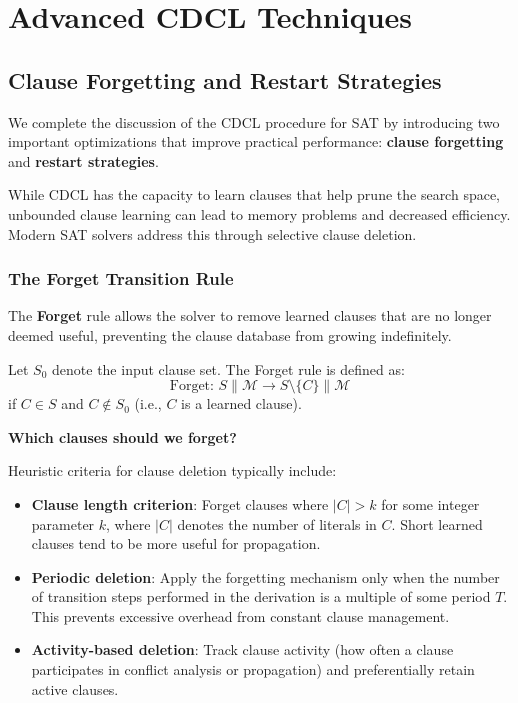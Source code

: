 \documentclass[11pt,a4paper]{article}
\theoremstyle{definition}
\theoremstyle{plain}
\theoremstyle{remark}
\begin{document}
\newpage 

\section{Advanced CDCL Techniques}

\subsection{Clause Forgetting and Restart Strategies}

We complete the discussion of the CDCL procedure for SAT by introducing two important optimizations that improve practical performance: \textbf{clause forgetting} and \textbf{restart strategies}.

While CDCL has the capacity to learn clauses that help prune the search space, unbounded clause learning can lead to memory problems and decreased efficiency. Modern SAT solvers address this through selective clause deletion.

\subsubsection{The Forget Transition Rule}

The \textbf{Forget} rule allows the solver to remove learned clauses that are no longer deemed useful, preventing the clause database from growing indefinitely.

\begin{tcolorbox}[colback=red!5!white,colframe=red!75!black,title=\textbf{Forget Transition Rule}]
Let $S_0$ denote the input clause set. The Forget rule is defined as:
\[
\text{Forget: } S \parallel \mathcal{M} \longrightarrow S \setminus \{C\} \parallel \mathcal{M}
\]
if $C \in S$ and $C \notin S_0$ (i.e., $C$ is a learned clause).
\end{tcolorbox}

\textbf{Which clauses should we forget?}

Heuristic criteria for clause deletion typically include:
\begin{itemize}
    \item \textbf{Clause length criterion}: Forget clauses where $|C| > k$ for some integer parameter $k$, where $|C|$ denotes the number of literals in $C$. Short learned clauses tend to be more useful for propagation.
    
    \item \textbf{Periodic deletion}: Apply the forgetting mechanism only when the number of transition steps performed in the derivation is a multiple of some period $T$. This prevents excessive overhead from constant clause management.
    
    \item \textbf{Activity-based deletion}: Track clause activity (how often a clause participates in conflict analysis or propagation) and preferentially retain active clauses.
\end{itemize}
\end{document}
